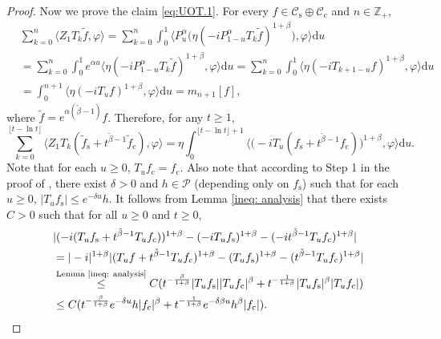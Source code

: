 \documentclass[12pt,a4paper]{amsart}
\theoremstyle{plain}
\theoremstyle{definition}
\numberwithin{equation}{section}
\begin{document}
\begin{proof}
	Now we prove the claim \eqref{eq:UOT.1}.
	For every $f\in \mathcal C_\mathrm s  \oplus \mathcal C_\mathrm c$ and $n\in \mathbb Z_+$,
 \begin{align}
  	& \sum_{k=0}^n \langle Z_1 T_{k} \tilde f, \varphi \rangle
  	= \sum_{k=0}^n \int_0^1 \big\langle P_u^\alpha \big(\eta(-iP_{1 - u}^\alpha T_k \tilde f)^{1+\beta}\big), \varphi\big\rangle \mathrm du
 	\\& = \sum_{k=0}^n \int_0^1 e^{\alpha u} \langle \eta (-iP_{1 - u}^\alpha T_{k}\tilde f)^{1+\beta}, \varphi \rangle \mathrm du
 	= \sum_{k=0}^n \int_0^1 \langle \eta (-iT_{k+1 - u} f)^{1+\beta}, \varphi\rangle \mathrm du
 	\\&= \int_0^{n+1} \langle  \eta (-iT_{u} f)^{1+\beta}, \varphi\rangle \mathrm du
 	= m_{n+1}[f],
\end{align}
	where $\tilde f=e^{\alpha(\tilde \beta - 1)} f$.
	Therefore, for any $t\geq 1$,
\begin{equation} \label{eq:UOT.15}
	\sum_{k=0}^{\lfloor t-\ln t \rfloor} \langle Z_1T_{k}(\tilde f_\mathrm s+t^{\tilde{\beta}-1}\tilde{f}_\mathrm c), \varphi\rangle
	= \eta \int_0^{\lfloor t-\ln t \rfloor+1}\big\langle \big(-iT_u(f_\mathrm s+t^{\tilde{\beta}-1}f_\mathrm c)\big)^{1+\beta},\varphi \big\rangle \mathrm du.
\end{equation}
	Note that for each $u\geq 0$, $T_uf_\mathrm c=f_\mathrm c$.
	Also note that according to
 	Step 1 in the proof of \cite[Lemma 2.6]{RenSongSunZhao2019Stable}, there exist $\delta> 0$ and $h\in \mathcal P$ (depending only on $f_\mathrm s$) such that for each $u\geq 0$, $|T_u f_\mathrm s|\leq e^{-\delta u}h$.
	It follows from Lemma \ref{ineq: analysis} that there exists $C>0$ such that for all $u\geq 0$ and $t\geq 0$,
\begin{align}
  	&|(-i(T_uf_\mathrm s+t^{\tilde{\beta}-1}T_uf_\mathrm c))^{1+\beta}-(-iT_uf_\mathrm s)^{1+\beta}-(-it^{\tilde{\beta}-1}T_uf_\mathrm c)^{1+\beta}|
  	\\&  = |-i|^{1+\beta} |(T_u f + t^{\tilde \beta -1} T_u f_\mathrm c)^{1+\beta} - (T_u f_\mathrm s)^{1+\beta} - (t^{\tilde \beta - 1}T_u f_\mathrm c)^{1+\beta}|
  	\\&\overset{\text{Lemma \ref{ineq: analysis}}}
  	\leq  C(t^{-\frac{\beta}{1+\beta}}|T_uf_\mathrm s||T_uf_\mathrm c|^{\beta}+t^{-\frac{1}{1+\beta}}|T_uf_\mathrm s|^{\beta}|T_uf_\mathrm c|)
  	\\&\label{eq:UOT.21}\leq C(t^{-\frac{\beta}{1+\beta}}e^{-\delta u}h|f_\mathrm c|^{\beta}+t^{-\frac{1}{1+\beta}}e^{-\delta\beta u}h^{\beta}|f_\mathrm c|).
\end{align}

\end{proof}
\end{document}
